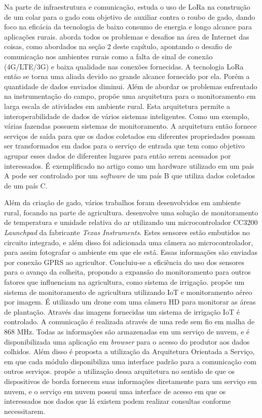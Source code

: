 \documentclass[
    hidelinks,
	12pt,				%
	openany,
	oneside, 
	a4paper,			%
	english,			%
	french,				%
	spanish,			%
	brazil				%
	]{abntex2}
\begin{document}
Na parte de infraestrutura e comunicação, \cite{Pham2017lora} estuda o uso de LoRa na construção de um colar para o gado com objetivo de auxiliar contra o roubo de gado, dando foco na eficácia da tecnologia de baixo consumo de energia e longo alcance para aplicações rurais. \cite{Brewster2017IoTAgroLargeScale} aborda todos os problemas e desafios na área de Internet das coisas, como abordados na seção 2 deste capítulo, apontando o desafio de comunicação nos ambientes rurais como a falta de sinal de conexão (4G/LTE/3G) e baixa qualidade nas conexões fornecidas. A tecnologia LoRa então se torna uma aliada devido ao grande alcance fornecido por ela. Porém a quantidade de dados enviados diminui. Além de abordar os problemas enfrentado na instrumentação do campo, \citeauthor{Brewster2017IoTAgroLargeScale} propõe uma arquitetura para o monitoramento em larga escala de atividades em ambiente rural. Esta arquitetura permite a interoperabilidade de dados de vários sistemas inteligentes. Como um exemplo, várias fazendas possuem sistemas de monitoramento. A arquitetura então fornece serviços de saída para que os dados coletados em diferentes propriedades possam ser transformados em dados para o serviço de entrada que tem como objetivo agrupar esses dados de diferentes lugares para então serem acessados por interessados. É exemplificado no artigo como um hardware utilizado em um país A pode ser controlado por um \textit{software} de um país B que utiliza dados coletados de um país C.

Além da criação de gado, vários trabalhos foram desenvolvidos em ambiente rural, focando na parte de agricultura. \cite{Prathibha2017SmartAgro} desenvolve uma solução de monitoramento de temperatura e umidade relativa do ar utilizando um microcontrolador CC3200 \textit{Launchpad} da fabricante \textit{Texas Instruments}. Estes sensores estão embutidos no circuito integrado, e além disso foi adicionada uma câmera ao microcontrolador, para assim fotografar o ambiente em que ele está. Essas informações são enviadas por conexão GPRS ao agricultor. Concluiu-se a eficiência do uso dos sensores para o avanço da colheita, propondo a expansão do monitoramento para outros fatores que influenciam na agricultura, como sistema de irrigação. \cite{Cambra2017AgroMonitoring} propõe um sistema de monitoramento de agricultura utilizando IoT e monitoramento aéreo por imagem. É utilizado um drone com uma câmera HD para monitorar as áreas de plantação. Através das imagens fornecidas um sistema de irrigação IoT é controlado. A comunicação é realizada através de uma rede sem fio em malha de 868 MHz. Todas as informações são armazenadas em um serviço de nuvem, e é disponibilizada uma aplicação em \textit{browser} para o acesso do produtor aos dados colhidos. Além disso é proposta a utilização da Arquitetura Orientada a Serviço, em que cada módulo disponibiliza uma interface padrão para a comunicação com outros serviços. \citeauthor{Cambra2017AgroMonitoring} propõe a utilização dessa arquitetura no sentido de que os dispositivos de borda fornecem suas informações diretamente para um serviço em nuvem, e o serviço em nuvem possui uma interface de acesso em que os interessados nos dados que lá existem podem realizar consultas conforme necessitarem. 
\end{document}
